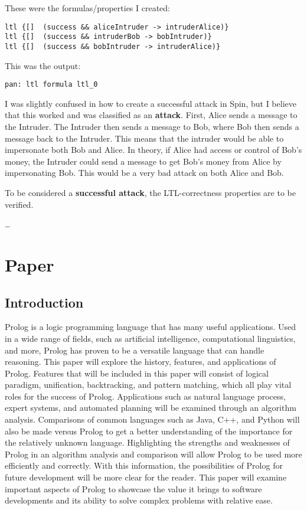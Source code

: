 \documentclass{article}
\theoremstyle{theorem}
\theoremstyle{definition}
\theoremstyle{remark}
\begin{document}
\noindent\newline These were the formulas/properties I created:
\begin{verbatim}
ltl {[]  (success && aliceIntruder -> intruderAlice)}
ltl {[]  (success && intruderBob -> bobIntruder)}
ltl {[]  (success && bobIntruder -> intruderAlice)}
\end{verbatim}

\noindent\newline This was the output:
\begin{verbatim}
pan: ltl formula ltl_0
\end{verbatim}

\noindent\newline I was slightly confused in how to create a successful attack in Spin, but I believe that this worked and was classified as an \textbf{attack}. First, Alice sends a message to the Intruder. The Intruder then sends a message to Bob, where Bob then sends a message back to the Intruder. This means that the intruder would be able to impersonate both Bob and Alice. In theory, if Alice had access or control of Bob's money, the Intruder could send a message to get Bob's money from Alice by impersonating Bob. This would be a very bad attack on both Alice and Bob.


\noindent\newline To be considered a \textbf{successful attack}, the LTL-correctness properties are to be verified.

\ldots

\section{Paper}
\subsection{Introduction}

Prolog is a logic programming language that has many useful applications. Used in a wide range of fields, such as artificial intelligence, computational linguistics, and more, Prolog has proven to be a versatile language that can handle reasoning. This paper will explore the history, features, and applications of Prolog. Features that will be included in this paper will consist of logical paradigm, unification, backtracking, and pattern matching, which all play vital roles for the success of Prolog. Applications such as natural language process, expert systems, and automated planning will be examined through an algorithm analysis. Comparisons of common languages such as Java, C++, and Python will also be made versus Prolog to get a better understanding of the importance for the relatively unknown language. Highlighting the strengths and weaknesses of Prolog in an algorithm analysis and comparison will allow Prolog to be used more efficiently and correctly. With this information, the possibilities of Prolog for future development will be more clear for the reader. This paper will examine important aspects of Prolog to showcase the value it brings to software developments and its ability to solve complex problems with relative ease.\newline
\end{document}
